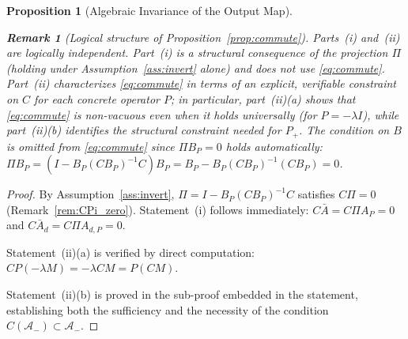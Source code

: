 \documentclass[10pt]{amsart}
\newcommand{\Ac}{\mathcal{A}}
\numberwithin{equation}{section}
\newtheorem{proposition}[theorem]{Proposition}
\newtheorem{remark}[theorem]{Remark}
\begin{document}
\begin{proposition}[Algebraic Invariance of the Output Map]
\begin{remark}[Logical structure of Proposition~\ref{prop:commute}]
\label{rem:commute_logic}
Parts~(i) and~(ii) are logically independent. Part~(i) is a structural consequence of
the projection $\Pi$ (holding under Assumption~\ref{ass:invert} alone) and does not use
\eqref{eq:commute}. Part~(ii) characterizes \eqref{eq:commute} in terms of an explicit,
verifiable constraint on $C$ for each concrete operator $P$; in particular, part~(ii)(a)
shows that \eqref{eq:commute} is non-vacuous even when it holds universally (for $P = -\lambda I$),
while part~(ii)(b) identifies the structural constraint needed for $P_+$. The condition
on $B$ is omitted from \eqref{eq:commute} since $\Pi B_P = 0$ holds automatically:
$\Pi B_P = (I - B_P(CB_P)^{-1}C)B_P = B_P - B_P(CB_P)^{-1}(CB_P) = 0$.
\end{remark}
\end{proposition}

\begin{proof}
By Assumption~\ref{ass:invert}, $\Pi = I - B_P(CB_P)^{-1}C$ satisfies $C\Pi = 0$
(Remark~\ref{rem:CPi_zero}). Statement~(i) follows immediately:
$C\bar{A} = C\Pi A_P = 0$ and $C\bar{A}_d = C\Pi A_{d,P} = 0$.

Statement~(ii)(a) is verified by direct computation: $CP(-\lambda M) = -\lambda CM = P(CM)$.

Statement~(ii)(b) is proved in the sub-proof embedded in the statement, establishing
both the sufficiency and the necessity of the condition $C(\Ac_-) \subset \Ac_-$.
\end{proof}
\end{document}
